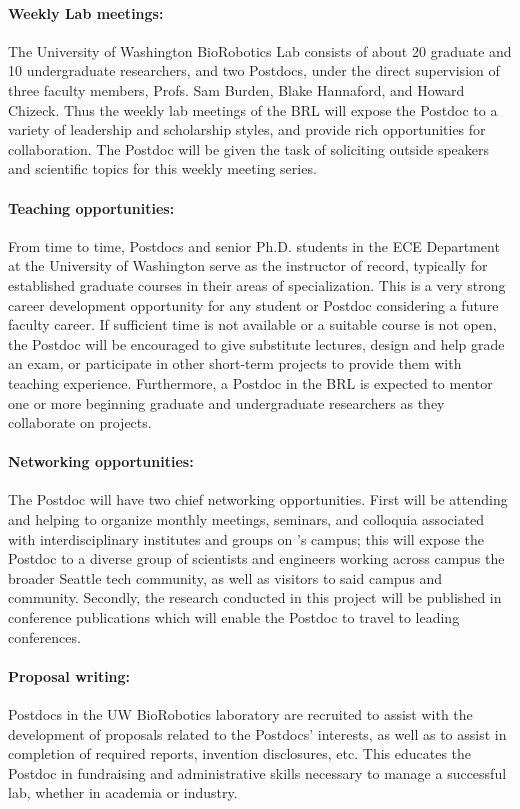 \documentclass[11pt]{article}
\begin{document}
\paragraph{Weekly Lab meetings:} 
The University of Washington BioRobotics Lab consists of about 20 graduate and 
10 undergraduate researchers, and two Postdocs, under the direct supervision of
three faculty members, Profs. Sam Burden, Blake Hannaford, and Howard Chizeck. 
Thus the weekly lab meetings of the BRL will 
expose the Postdoc to a variety of leadership and scholarship styles, and 
provide rich opportunities for collaboration.  
The Postdoc will be given the task of soliciting outside speakers and scientific topics for this weekly meeting series.

\paragraph{Teaching opportunities:}  From time to time, Postdocs and senior 
Ph.D. students in the ECE Department at the University of Washington serve as the instructor of record, typically for established graduate courses in their 
areas of specialization.  This is a very strong career development opportunity 
for any student or Postdoc considering a future faculty career.   If sufficient 
time is not available or a suitable course is not open, the Postdoc will be 
encouraged to give substitute lectures, design and help grade an exam, or participate in other short-term  projects to provide them with teaching experience. 
Furthermore, a Postdoc in the BRL is expected to mentor one or more beginning graduate and 
undergraduate researchers as they collaborate on projects. 

\paragraph{Networking opportunities:}  The Postdoc will have two chief networking opportunities.  
First will be attending and helping to organize monthly meetings, seminars, and colloquia associated with interdisciplinary institutes and groups on {\UW}'s campus; this will expose the Postdoc to a diverse group of scientists and engineers working across campus the broader Seattle tech community, as well as visitors to said campus and community.
 Secondly, the research conducted in this project will be published in 
conference publications which will enable the Postdoc to travel to leading 
conferences. 

\paragraph{Proposal writing:} Postdocs in the UW BioRobotics laboratory are recruited to 
assist with the development of proposals related to the Postdocs' interests, as 
well as to assist in completion of required reports, invention disclosures, etc. 
This educates the Postdoc in fundraising and administrative skills 
necessary to manage a successful lab, whether in academia or industry.  
\end{document}
